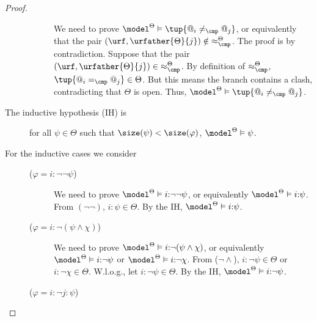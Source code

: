 \begin{proof}
\begin{description}
\begin{description}
                    We need to prove $\model^\Theta \vDash \tup{@_i \neq_{\cmp} @_j}$, or equivalently that the pair ${(\urf, \urfather{\Theta}{j})} \notin {\approx^{\Theta}_{\cmp}}$.
                    The proof is by contradiction.
                    Suppose that the pair ${(\urf, \urfather{\Theta}{j})} \in {\approx^{\Theta}_{\cmp}}$.
                    By definition of ${\approx^{\Theta}_{\cmp}}$, $\tup{@_i =_{\cmp} @_j} \in \Theta$.
                    But this means the branch contains a clash, contradicting that $\Theta$ is open. Thus, $\model^\Theta \vDash \tup{@_i \neq_{\cmp} @_j}$. 
            \end{description}
        \item[\textnormal{The inductive hypothesis (IH) is}] for all $\psi \in \Theta$ such that $\size(\psi) < \size(\varphi)$,  $\model^\Theta \vDash \psi$.
        \item[\textnormal{For the inductive cases we consider}] \hfill
        \begin{description}
            \item[($\varphi = i{:}\lnot\lnot \psi$)]
                We need to prove $\model^{\Theta} \vDash i{:}\lnot\lnot\psi$, or equivalently
                    $\model^{\Theta} \vDash i{:}\psi$.
                From $(\lnot\lnot)$, ${i{:}\psi \in \Theta}$.
                By the IH, $\model^{\Theta} \vDash i{:}\psi$.
            \item[($\varphi = i{:}\lnot (\psi \land \chi)$)]
                We need to prove $\model^{\Theta} \vDash i{:}\lnot(\psi \land \chi)$, or equivalently
                    $\model^{\Theta} \vDash i{:}\lnot\psi$ or
                    $\model^{\Theta} \vDash i{:}\lnot\chi$.
                From ($\lnot\land$), $i{:}\lnot\psi \in \Theta$ or $i{:}\lnot\chi \in \Theta$.
                W.l.o.g., let $i{:}\lnot\psi \in \Theta$. By the IH, $\model^{\Theta} \vDash i{:}\lnot\psi$.
            \item[($\varphi = i{:}\lnot j{:}\psi$)]

\end{description}
\end{description}
\end{proof}
